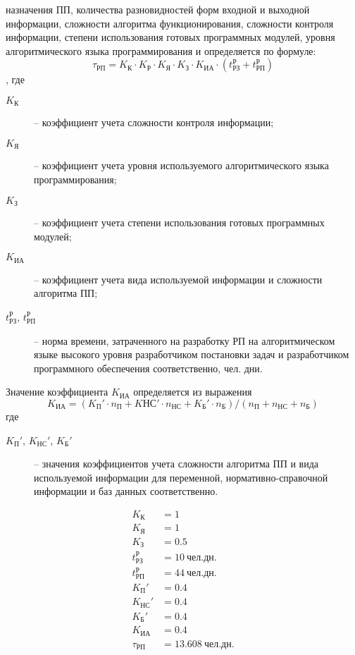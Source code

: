 \documentclass[a4paper,12pt]{article}\usepackage[]{graphicx}\usepackage[]{color}
\numberwithin{equation}{section}
\newcommand{\un}[1]{\: \mathit{#1}} %
\begin{document}
назначения ПП, количества разновидностей форм входной и выходной информации,
сложности алгоритма функционирования, сложности контроля информации, степени
использования готовых программных модулей, уровня алгоритмического языка
программирования и определяется по формуле:
\begin{equation}
  \tau_{РП} = K_К \cdot K_Р \cdot K_Я \cdot K_З \cdot K_{ИА} \cdot \left( t_{РЗ}^Р + t_{РП}^Р \right)
\end{equation}
, где
\begin{description}
\item[$K_К$] -- коэффициент учета сложности контроля информации; 
\item[$K_Я$] -- коэффициент  учета  уровня  используемого  алгоритмического 
языка программирования; 
\item[$K_З$] -- коэффициент учета степени использования готовых программных 
модулей;
\item[$K_{ИА}$] -- коэффициент учета вида используемой информации и сложности 
алгоритма ПП;
\item[$t_{РЗ}^Р$, $t_{РП}^Р$] -- норма времени, затраченного на разработку РП на
алгоритмическом языке высокого уровня разработчиком постановки задач и
разработчиком программного обеспечения соответственно, чел. дни.
\end{description}
Значение коэффициента $K_{ИА}$ определяется из выражения
\begin{equation}
  K_{ИА} = \left( K_П' \cdot n_П + K{НС}' \cdot n_{НС} + K_Б' \cdot n_Б \right) / \left( n_П + n_{НС} + n_Б \right)
\end{equation}
где 
\begin{description}
\item[$K_П'$, $K_{НС}'$, $K_Б'$] -- значения коэффициентов учета сложности
алгоритма ПП и вида используемой информации для переменной,
нормативно-справочной информации и баз данных соответственно.
\end{description}
\begin{align*}
  K_К &= 1 \\
  K_Я &= 1 \\
  K_З &= 0.5 \\
  t_{РЗ}^Р &= 10 \un{чел.дн.} \\
  t_{РП}^Р &= 44 \un{чел.дн.} \\
  K_П' &= 0.4 \\
  K_{НС}' &= 0.4 \\
  K_Б' &= 0.4 \\
  K_{ИА} &= 0.4 \\
  \tau_{РП} &= 13.608 \un{чел.дн.}
\end{align*}
\end{document}

